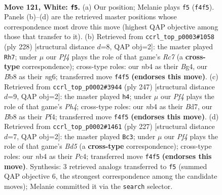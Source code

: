 \documentclass[11pt]{article}
\begin{document}
\clearpage

\begin{figure}[p]\centering
\begin{subfigure}{0.46\textwidth}\centering
\resizebox{\linewidth}{!}{%
\newchessgame
\chessboard[
  setfen={1B4k1/8/7K/8/1nb2P2/8/8/8 w - - 5 121},
  showmover=false,
  pgfstyle=straightmove, color=movearrow, markmove={f4-f5}
]}
\caption{}
\end{subfigure}\hfill
\begin{subfigure}{0.46\textwidth}\centering
\resizebox{\linewidth}{!}{%
\newchessgame
\chessboard[
  setfen={8/2R5/5bn1/3K4/6B1/8/1k6/8 w - - 69 115},
  showmover=false,
  pgfstyle=straightmove, color=movearrow, markmove={c7-h7}
]}
\caption{}
\end{subfigure}
\\[4pt]
\begin{subfigure}{0.46\textwidth}\centering
\resizebox{\linewidth}{!}{%
\newchessgame
\chessboard[
  setfen={8/3b4/8/2B4p/5p2/6k1/8/6K1 b - - 95 124},
  showmover=false,
  pgfstyle=straightmove, color=movearrow, markmove={h5-h4}
]}
\caption{}
\end{subfigure}\hfill
\begin{subfigure}{0.46\textwidth}\centering
\resizebox{\linewidth}{!}{%
\newchessgame
\chessboard[
  setfen={6k1/4B3/6K1/8/2pbB3/8/8/8 b - - 3 114},
  showmover=false,
  pgfstyle=straightmove, color=movearrow, markmove={d4-c3}
]}
\caption{}
\end{subfigure}
\caption{\textbf{Move 121, White: \texttt{f5}.} (a) Our position; Melanie plays \texttt{f5} (\texttt{f4f5}). Panels (b)--(d) are the retrieved master positions whose correspondence most drove this move (highest QAP objective among those that transfer to it). (b) Retrieved from \texttt{ccrl\_top\_p0003\#1058} (ply 228) [structural distance $d$=8, QAP obj=2]: the master played \texttt{Rh7}; under $\mu$ our \emph{Pf4} plays the role of that game's \emph{Rc7} (a \textbf{cross-type} correspondence); cross-type roles: our \emph{n}b4 as their \emph{B}g4, our \emph{B}b8 as their \emph{n}g6; transferred move \texttt{f4f5} \textbf{(endorses this move)}. (c) Retrieved from \texttt{ccrl\_top\_p0002\#3944} (ply 247) [structural distance $d$=9, QAP obj=2]: the master played \texttt{h4}; under $\mu$ our \emph{Pf4} plays the role of that game's \emph{Ph4}; cross-type roles: our \emph{n}b4 as their \emph{B}d7, our \emph{B}b8 as their \emph{P}f4; transferred move \texttt{f4f5} \textbf{(endorses this move)}. (d) Retrieved from \texttt{ccrl\_top\_p0002\#1461} (ply 227) [structural distance $d$=7, QAP obj=2]: the master played \texttt{Bc3}; under $\mu$ our \emph{Pf4} plays the role of that game's \emph{Bd5} (a \textbf{cross-type} correspondence); cross-type roles: our \emph{n}b4 as their \emph{P}c4; transferred move \texttt{f4f5} \textbf{(endorses this move)}. Synthesis: 3 retrieved analogs transferred to \texttt{f5} (summed QAP objective 6, the strongest correspondence among the candidate moves); Melanie committed it via the \texttt{search} selector.}
\label{fig:thought-m240}
\end{figure}
\end{document}
